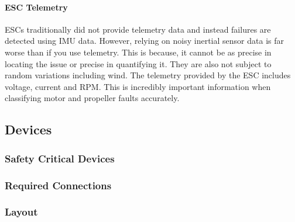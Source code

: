 \paragraph{\gls{ESC} Telemetry}
\gls{ESC}s traditionally did not provide telemetry data and instead failures are detected using \gls{IMU} data. However, relying on noisy inertial sensor data is far worse than if you use telemetry. This is because, it cannot be as precise in locating the issue or precise in quantifying it. They are also not subject to random variations including wind. The telemetry provided by the \gls{ESC} includes voltage, current and \gls{RPM}. This is incredibly important information when classifying motor and propeller faults accurately.  

\subsection{Devices}
\subsubsection{Safety Critical Devices}
\subsubsection{Required Connections}
\subsubsection{Layout}

